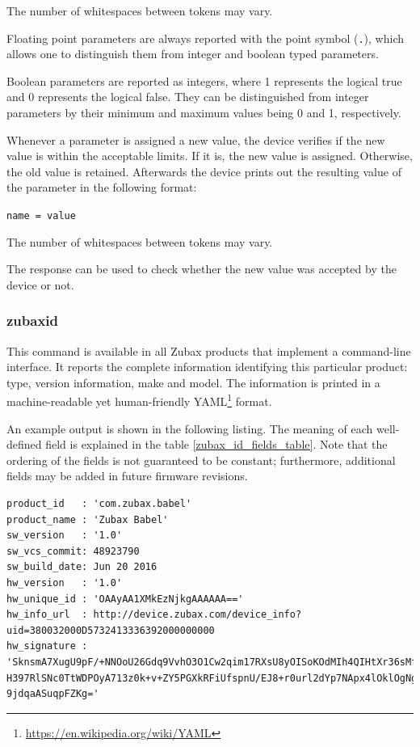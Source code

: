\documentclass{zubaxdoc}
\begin{document}
The number of whitespaces between tokens may vary.

Floating point parameters are always reported with the point symbol (\verb|.|),
which allows one to distinguish them from integer and boolean typed parameters.

Boolean parameters are reported as integers, where 1 represents the logical true and
0 represents the logical false.
They can be distinguished from integer parameters by their minimum and maximum values being 0 and 1,
respectively.

Whenever a parameter is assigned a new value, the device verifies if the new value is within the
acceptable limits.
If it is, the new value is assigned. Otherwise, the old value is retained.
Afterwards the device prints out the resulting value of the parameter in the following format:

\verb|name = value|

The number of whitespaces between tokens may vary.

The response can be used to check whether the new value was accepted by the device or not.

\subsubsection{zubax\textunderscore{}id}\label{sec:cli_command_zubax_id}

This command is available in all Zubax products that implement a command-line interface.
It reports the complete information identifying this particular product:
type, version information, make and model.
The information is printed in a machine-readable yet human-friendly
YAML\footnote{\url{https://en.wikipedia.org/wiki/YAML}} format.

An example output is shown in the following listing.
The meaning of each well-defined field is explained in the table \ref{zubax_id_fields_table}.
Note that the ordering of the fields is not guaranteed to be constant;
furthermore, additional fields may be added in future firmware revisions.

\begin{minipage}{0.9\textwidth} %
\begin{verbatim}
product_id   : 'com.zubax.babel'
product_name : 'Zubax Babel'
sw_version   : '1.0'
sw_vcs_commit: 48923790
sw_build_date: Jun 20 2016
hw_version   : '1.0'
hw_unique_id : 'OAAyAA1XMkEzNjkgAAAAAA=='
hw_info_url  : http://device.zubax.com/device_info?uid=380032000D5732413336392000000000
hw_signature : 'SknsmA7XugU9pF/+NNOoU26Gdq9VvhO3O1Cw2qim17RXsU8yOISoKOdMIh4QIHtXr36sMfx
H397RlSNc0TtWDPOyA713z0k+v+ZY5PGXkRFiUfspnU/EJ8+r0url2dYp7NApx4lOklOgNgHrGCA6lPxA8UqoW
9jdqaASuqpFZKg='
\end{verbatim}
\end{minipage}
\end{document}
